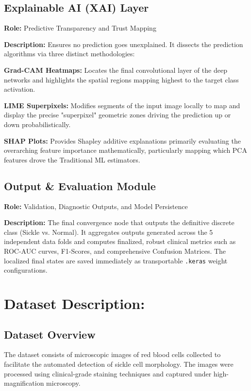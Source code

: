 \subsection{Explainable AI (XAI) Layer}

\noindent\textbf{Role:} Predictive Transparency and Trust Mapping

\noindent\textbf{Description:} Ensures no prediction goes unexplained. It dissects the prediction algorithms via three distinct methodologies:

\noindent\textbf{Grad-CAM Heatmaps:} Locates the final convolutional layer of the deep networks and highlights the spatial regions mapping highest to the target class activation.

\noindent\textbf{LIME Superpixels:} Modifies segments of the input image locally to map and display the precise "superpixel" geometric zones driving the prediction up or down probabilistically.

\noindent\textbf{SHAP Plots:} Provides Shapley additive explanations primarily evaluating the overarching feature importance mathematically, particularly mapping which PCA features drove the Traditional ML estimators.

\subsection{Output \& Evaluation Module}

\noindent\textbf{Role:} Validation, Diagnostic Outputs, and Model Persistence

\noindent\textbf{Description:} The final convergence node that outputs the definitive discrete class (Sickle vs. Normal). It aggregates outputs generated across the 5 independent data folds and computes finalized, robust clinical metrics such as ROC-AUC curves, F1-Scores, and comprehensive Confusion Matrices. The localized final states are saved immediately as transportable \texttt{.keras} weight configurations.

\section{Dataset Description:}

\subsection{Dataset Overview}

The dataset consists of microscopic images of red blood cells collected to facilitate the automated detection of sickle cell morphology. The images were processed using clinical-grade staining techniques and captured under high-magnification microscopy.

